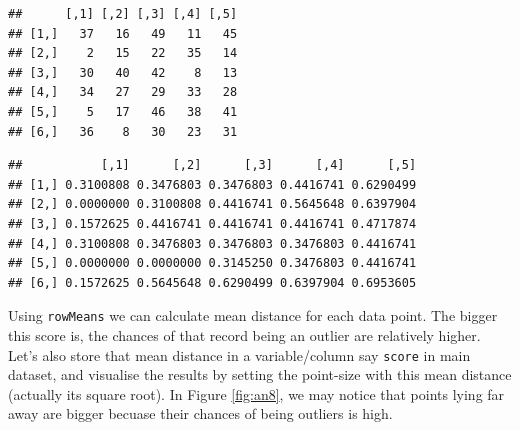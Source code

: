 \documentclass[
]{book}
\newenvironment{Shaded}{\begin{snugshade}}{\end{snugshade}}
\newcommand{\AttributeTok}[1]{\textcolor[rgb]{0.13,0.29,0.53}{#1}}
\newcommand{\FunctionTok}[1]{\textcolor[rgb]{0.13,0.29,0.53}{\textbf{#1}}}
\newcommand{\NormalTok}[1]{#1}
\newcommand{\OtherTok}[1]{\textcolor[rgb]{0.56,0.35,0.01}{#1}}
\newcommand{\SpecialCharTok}[1]{\textcolor[rgb]{0.81,0.36,0.00}{\textbf{#1}}}
\newcommand{\StringTok}[1]{\textcolor[rgb]{0.31,0.60,0.02}{#1}}
\begin{document}
\begin{verbatim}
##      [,1] [,2] [,3] [,4] [,5]
## [1,]   37   16   49   11   45
## [2,]    2   15   22   35   14
## [3,]   30   40   42    8   13
## [4,]   34   27   29   33   28
## [5,]    5   17   46   38   41
## [6,]   36    8   30   23   31
\end{verbatim}

\begin{Shaded}
\end{Shaded}

\begin{verbatim}
##           [,1]      [,2]      [,3]      [,4]      [,5]
## [1,] 0.3100808 0.3476803 0.3476803 0.4416741 0.6290499
## [2,] 0.0000000 0.3100808 0.4416741 0.5645648 0.6397904
## [3,] 0.1572625 0.4416741 0.4416741 0.4416741 0.4717874
## [4,] 0.3100808 0.3476803 0.3476803 0.3476803 0.4416741
## [5,] 0.0000000 0.0000000 0.3145250 0.3476803 0.4416741
## [6,] 0.1572625 0.5645648 0.6290499 0.6397904 0.6953605
\end{verbatim}

Using \texttt{rowMeans} we can calculate mean distance for each data point. The bigger this score is, the chances of that record being an outlier are relatively higher. Let's also store that mean distance in a variable/column say \texttt{score} in main dataset, and visualise the results by setting the point-size with this mean distance (actually its square root). In Figure \ref{fig:an8}, we may notice that points lying far away are bigger becuase their chances of being outliers is high.

\begin{Shaded}
\end{Shaded}
\end{document}
